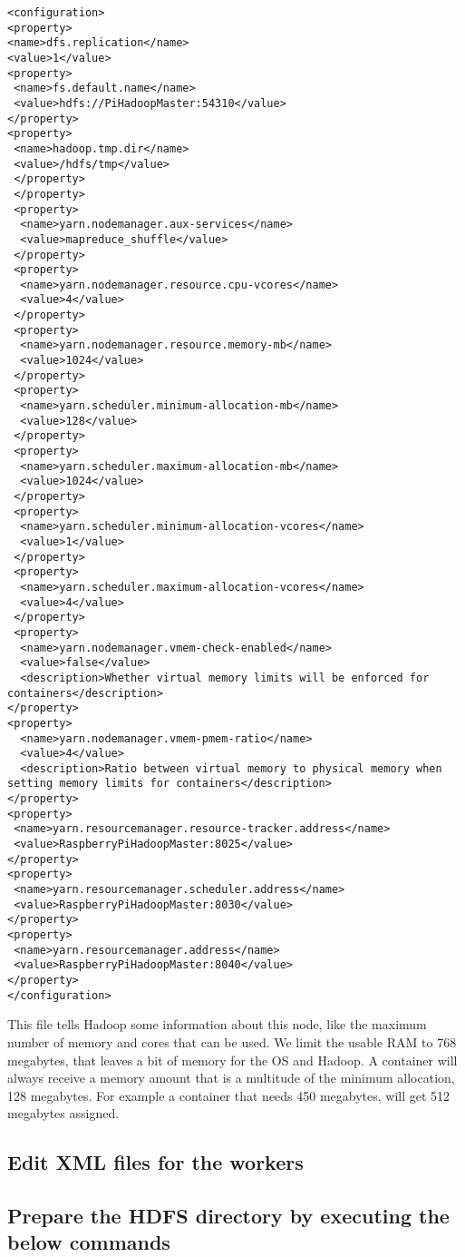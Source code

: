 \begin{lstlisting}
<configuration>
<property>
<name>dfs.replication</name>
<value>1</value>
<property>
 <name>fs.default.name</name>
 <value>hdfs://PiHadoopMaster:54310</value>
</property>
<property>
 <name>hadoop.tmp.dir</name>
 <value>/hdfs/tmp</value>
 </property>
 </property>
 <property>
  <name>yarn.nodemanager.aux-services</name>
  <value>mapreduce_shuffle</value>
 </property>
 <property>
  <name>yarn.nodemanager.resource.cpu-vcores</name>
  <value>4</value>
 </property>
 <property>
  <name>yarn.nodemanager.resource.memory-mb</name>
  <value>1024</value>
 </property>
 <property>
  <name>yarn.scheduler.minimum-allocation-mb</name>
  <value>128</value>
 </property>
 <property>
  <name>yarn.scheduler.maximum-allocation-mb</name>
  <value>1024</value>
 </property>
 <property>
  <name>yarn.scheduler.minimum-allocation-vcores</name>
  <value>1</value>
 </property>
 <property>
  <name>yarn.scheduler.maximum-allocation-vcores</name>
  <value>4</value>
 </property>
 <property>
  <name>yarn.nodemanager.vmem-check-enabled</name>
  <value>false</value>
  <description>Whether virtual memory limits will be enforced for containers</description>
</property>
<property>
  <name>yarn.nodemanager.vmem-pmem-ratio</name>
  <value>4</value>
  <description>Ratio between virtual memory to physical memory when setting memory limits for containers</description>
</property>
<property>
 <name>yarn.resourcemanager.resource-tracker.address</name>
 <value>RaspberryPiHadoopMaster:8025</value>
</property>
<property>
 <name>yarn.resourcemanager.scheduler.address</name>
 <value>RaspberryPiHadoopMaster:8030</value>
</property>
<property>
 <name>yarn.resourcemanager.address</name>
 <value>RaspberryPiHadoopMaster:8040</value>
</property>
</configuration>
\end{lstlisting}

This file tells Hadoop some information about this node, like the
maximum number of memory and cores that can be used. We limit the usable
RAM to 768 megabytes, that leaves a bit of memory for the OS and Hadoop.
A container will always receive a memory amount that is a multitude of
the minimum allocation, 128 megabytes. For example a container that
needs 450 megabytes, will get 512 megabytes assigned.

\subsection{Edit XML files for the workers}

\subsection{Prepare the HDFS directory by executing the below commands}

